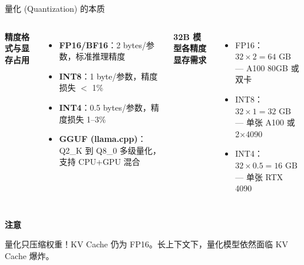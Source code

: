 \documentclass[UTF8,11pt,aspectratio=169]{beamer}
\newenvironment{warningblock}{
  \begin{alertblock}{\textbf{\twemoji{warning} 注意}}
}{
  \end{alertblock}
}
\begin{document}
\begin{frame}{量化 (Quantization) 的本质}
  \begin{columns}[T]
    \textbf{精度格式与显存占用}
    \begin{itemize}
      \item \textbf{FP16/BF16}：2 bytes/参数，标准推理精度
      \item \textbf{INT8}：1 byte/参数，精度损失 $<$ 1\%
      \item \textbf{INT4}：0.5 bytes/参数，精度损失 1--3\%
      \item \textbf{GGUF (llama.cpp)}：Q2\_K 到 Q8\_0 多级量化，支持 CPU+GPU 混合
    \end{itemize}

    \textbf{32B 模型各精度显存需求}
    \begin{itemize}
      \item FP16：$32\times 2 = 64\text{ GB}$ --- A100 80GB 或双卡
      \item INT8：$32\times 1 = 32\text{ GB}$ --- 单张 A100 或 2$\times$4090
      \item INT4：$32\times 0.5 = 16\text{ GB}$ --- 单张 RTX 4090
    \end{itemize}
  \end{columns}

  \vspace{0.5em}
  \begin{warningblock}
    量化只压缩权重！KV Cache 仍为 FP16。长上下文下，量化模型依然面临 KV Cache 爆炸。
  \end{warningblock}
\end{frame}
\end{document}
